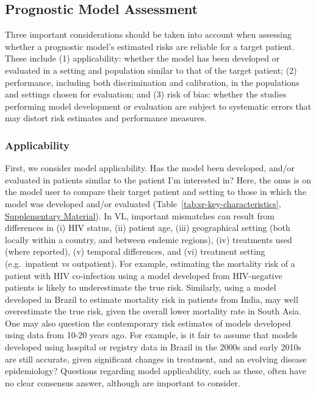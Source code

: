 \subsection{Prognostic Model Assessment}

Three important considerations should be taken into account when assessing whether a prognostic model's estimated risks are reliable for a target patient. These include (1) applicability: whether the model has been developed or evaluated in a setting and population similar to that of the target patient; (2) performance, including both discrimination and calibration, in the populations and settings chosen for evaluation; and (3) risk of bias: whether the studies performing model development or evaluation are subject to systematic errors that may distort risk estimates and performance measures.

\subsubsection{Applicability}

First, we consider model applicability. Has the model been developed, and/or evaluated in patients similar to the patient I'm interested in? Here, the onus is on the model user to compare their target patient and setting to those in which the model was developed and/or evaluated (Table~\ref{tab:sr-key-characteristics}, \href{https://github.com/jpwil/dphil}{Supplementary Material}). In VL, important mismatches can result from differences in (i) HIV status, (ii) patient age, (iii) geographical setting (both locally within a country, and between endemic regions), (iv) treatments used (where reported), (v) temporal differences, and (vi) treatment setting (e.g.\ inpatient vs outpatient). For example, estimating the mortality risk of a patient with HIV co-infection using a model developed from HIV-negative patients is likely to underestimate the true risk. Similarly, using a model developed in Brazil to estimate mortality risk in patients from India, may well overestimate the true risk, given the overall lower mortality rate in South Asia\cite{burza2018}. One may also question the contemporary risk estimates of models developed using data from 10-20 years ago. For example, is it fair to assume that models developed using hospital or registry data in Brazil in the 2000s and early 2010s are still accurate, given significant changes in treatment, and an evolving disease epidemiology\cite{lima2018}? Questions regarding model applicability, such as these, often have no clear consensus answer, although are important to consider.

